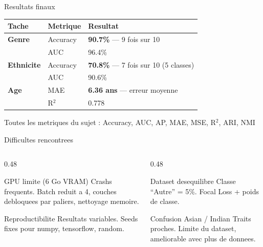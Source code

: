 \documentclass[aspectratio=169, 12pt]{beamer}
\begin{document}
\begin{frame}{Resultats finaux}

\begin{center}
{\small
\begin{tabular}{lll}
\toprule
\textbf{Tache} & \textbf{Metrique} & \textbf{Resultat} \\
\midrule
\textbf{Genre} & Accuracy & \textbf{90.7\%} {\color{steel}--- 9 fois sur 10} \\
 & AUC & 96.4\% \\
\midrule
\textbf{Ethnicite} & Accuracy & \textbf{70.8\%} {\color{steel}--- 7 fois sur 10 (5 classes)} \\
 & AUC & 90.6\% \\
\midrule
\textbf{Age} & MAE & \textbf{6.36 ans} {\color{steel}--- erreur moyenne} \\
 & R$^2$ & 0.778 \\
\bottomrule
\end{tabular}
}
\end{center}

\vspace{0.3cm}
{\small Toutes les metriques du sujet : Accuracy, AUC, AP, MAE, MSE, R$^2$, ARI, NMI}
\end{frame}

\begin{frame}{Difficultes rencontrees}

\begin{columns}[T]
\begin{column}{0.48\textwidth}
\begin{alertblock}{GPU limite (6 Go VRAM)}
{\small Crashs frequents. Batch reduit a 4, couches debloquees par paliers, nettoyage memoire.}
\end{alertblock}

\vspace{0.1cm}

\begin{alertblock}{Reproductibilite}
{\small Resultats variables. Seeds fixes pour numpy, tensorflow, random.}
\end{alertblock}
\end{column}

\begin{column}{0.48\textwidth}
\begin{alertblock}{Dataset desequilibre}
{\small Classe ``Autre'' = 5\%. Focal Loss + poids de classe.}
\end{alertblock}

\vspace{0.1cm}

\begin{alertblock}{Confusion Asian / Indian}
{\small Traits proches. Limite du dataset, ameliorable avec plus de donnees.}
\end{alertblock}
\end{column}
\end{columns}
\end{frame}
\end{document}
